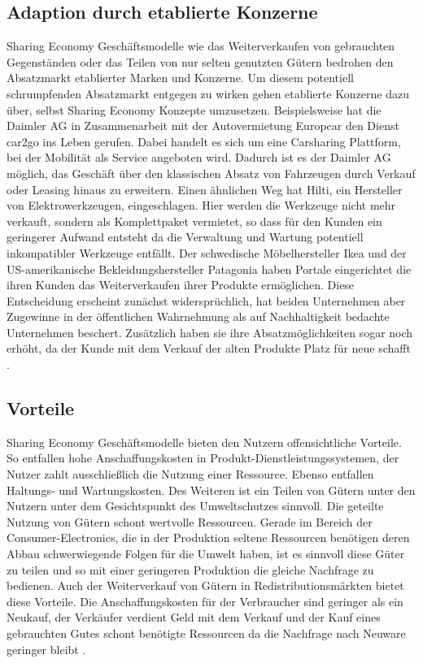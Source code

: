 \documentclass[a4paper]{scrartcl}
\begin{document}
\begin{multicols}{2}
	
		\subsection{Adaption durch etablierte Konzerne }
			Sharing Economy Gesch\"aftsmodelle wie das Weiterverkaufen von gebrauchten Gegenst\"anden oder das Teilen von nur selten genutzten G\"utern bedrohen den Absatzmarkt etablierter Marken und Konzerne. Um diesem potentiell schrumpfenden Absatzmarkt entgegen zu wirken gehen etablierte Konzerne dazu \"uber, selbst Sharing Economy Konzepte umzusetzen. Beispielsweise hat die Daimler AG in Zusammenarbeit mit der Autovermietung Europcar den Dienst car2go ins Leben gerufen. Dabei handelt es sich um eine Carsharing Plattform, bei der Mobilit\"at als Service angeboten wird. Dadurch ist es der Daimler AG m\"oglich, das Gesch\"aft \"uber den klassischen Absatz von Fahrzeugen durch Verkauf oder Leasing hinaus zu erweitern. Einen \"ahnlichen Weg hat Hilti, ein Hersteller von Elektrowerkzeugen, eingeschlagen. Hier werden die Werkzeuge nicht mehr verkauft, sondern als Komplettpaket vermietet, so dass f\"ur den Kunden ein geringerer Aufwand entsteht da die Verwaltung und Wartung potentiell inkompatibler Werkzeuge entf\"allt.
			Der schwedische M\"obelhersteller Ikea und der US-amerikanische Bekleidungshersteller Patagonia haben Portale eingerichtet die ihren Kunden das Weiterverkaufen ihrer Produkte erm\"oglichen. Diese Entscheidung erscheint zun\"achst widerspr\"uchlich, hat beiden Unternehmen aber Zugewinne in der \"offentlichen Wahrnehmung  als auf Nachhaltigkeit bedachte Unternehmen beschert. Zus\"atzlich haben sie ihre Absatzm\"oglichkeiten sogar noch erh\"oht, da der Kunde mit dem Verkauf der alten Produkte Platz f\"ur neue schafft \cite{matzler2014}.
			
	
	
		\subsection{Vorteile}
			Sharing Economy Gesch\"aftsmodelle bieten den Nutzern offensichtliche Vorteile. So entfallen hohe Anschaffungskosten in Produkt-Dienstleistungssystemen, der Nutzer zahlt ausschlie\ss lich die Nutzung einer Ressource. Ebenso entfallen Haltungs- und Wartungskosten. Des Weiteren ist ein Teilen von G\"utern unter den Nutzern unter dem Gesichtspunkt des Umweltschutzes sinnvoll. Die geteilte Nutzung von G\"utern schont wertvolle Ressourcen. Gerade im Bereich der Consumer-Electronics, die in der Produktion seltene Ressourcen ben\"otigen deren Abbau schwerwiegende Folgen f\"ur die Umwelt haben, ist es sinnvoll diese G\"uter zu teilen und so mit einer geringeren Produktion die gleiche Nachfrage zu bedienen. Auch der Weiterverkauf von G\"utern in Redistributionsm\"arkten bietet diese Vorteile. Die Anschaffungskosten f\"ur der Verbraucher sind geringer als ein Neukauf, der Verk\"aufer verdient Geld mit dem Verkauf und der Kauf eines gebrauchten Gutes schont ben\"otigte Ressourcen da die Nachfrage nach Neuware geringer bleibt \cite{matzler2014}.
	

\end{multicols}
\end{document}
